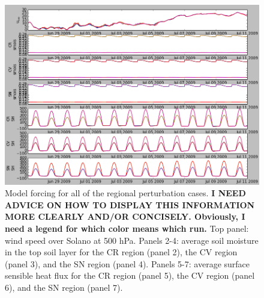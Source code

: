 \begin{figure}[here]
\includegraphics[width=1\textwidth]{ch3-wind/img/forcings_combo_good.png}
\caption{Model forcing for all of the regional perturbation cases.  \textbf{I NEED ADVICE ON HOW TO DISPLAY THIS INFORMATION MORE CLEARLY AND/OR CONCISELY. Obviously, I need a legend for which color means which run.}  Top panel: wind speed over Solano at 500 hPa.  Panels 2-4: average soil moisture in the top soil layer for the CR region (panel 2), the CV region (panel 3), and the SN region (panel 4).  Panels 5-7: average surface sensible heat flux for the CR region (panel 5), the CV region (panel 6), and the SN region (panel 7).}
\label{fig:windSol_forcings}
\end{figure}


